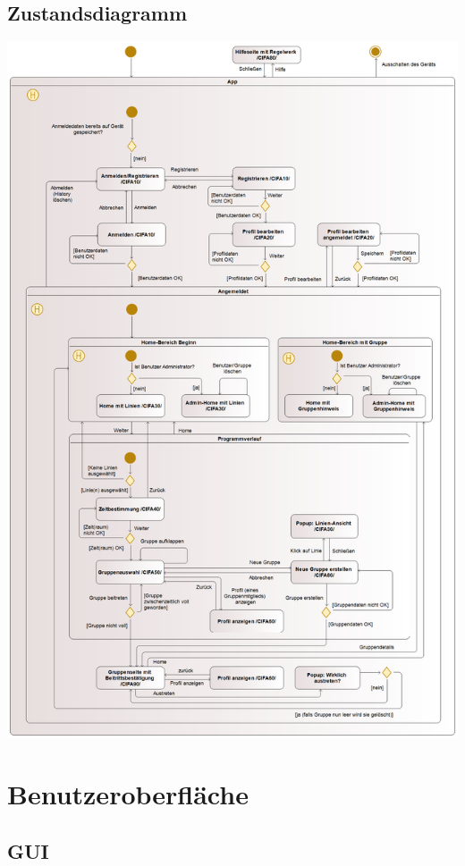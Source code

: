 \documentclass[a4paper]{scrreprt}
\begin{document}
\section{Zustandsdiagramm}
\begin{center}
	\includegraphics[scale=0.23]{res/Zustandsdiagramm.png}
\end{center}

\chapter{Benutzeroberfläche}
\section{GUI}
\end{document}
